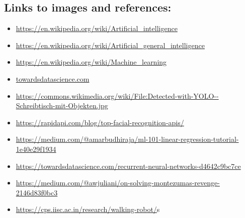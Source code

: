 \documentclass{article}
\begin{document}
        \subsection{Links to images and references:}
            \begin{itemize}
                \item \url{https://en.wikipedia.org/wiki/Artificial_intelligence}
                \item \url{https://en.wikipedia.org/wiki/Artificial_general_intelligence}
                \item \url{https://en.wikipedia.org/wiki/Machine_learning}
                \item \href{https://towardsdatascience.com/mnist-handwritten-digits-classification-using-a-convolutional-neural-network-cnn-af5fafbc35e9}{towardsdatascience.com}
                \item \url{https://commons.wikimedia.org/wiki/File:Detected-with-YOLO--Schreibtisch-mit-Objekten.jpg}
                \item \url{https://rapidapi.com/blog/top-facial-recognition-apis/}
                \item \url{https://medium.com/@amarbudhiraja/ml-101-linear-regression-tutorial-1e40e29f1934}
                \item \url{https://towardsdatascience.com/recurrent-neural-networks-d4642c9bc7ce}
                \item \url{https://medium.com/@awjuliani/on-solving-montezumas-revenge-2146d83f0bc3}
                \item \url{https://cps.iisc.ac.in/research/walking-robot/}s
            \end{itemize}
\end{document}
